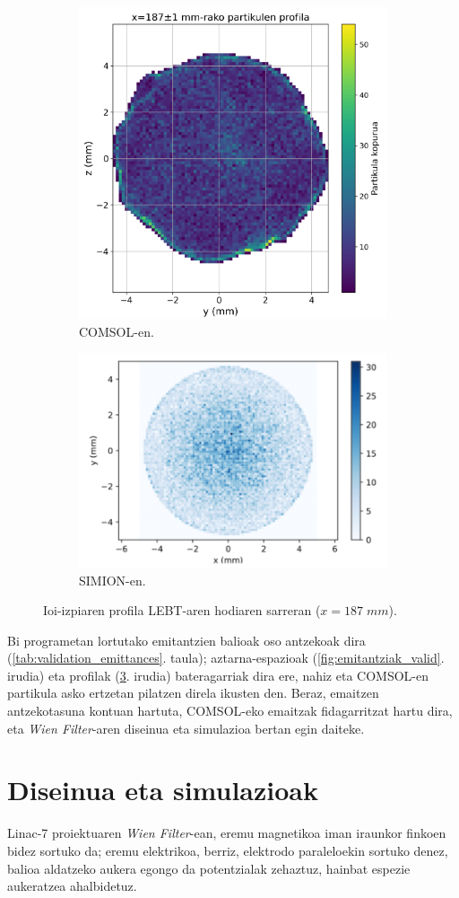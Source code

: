 \documentclass[12pt]{article}
\numberwithin{figure}{section}
\numberwithin{equation}{section}
\begin{document}
\begin{figure}[h]
    \centering
    \begin{subfigure}[b]{\textwidth}
        \centering
        \includegraphics[width=0.45\linewidth]{3 - COMSOL/exit_profile.png}
        \caption{COMSOL-en.}
        \label{fig:comsol_profile_valid}
    \end{subfigure}
    \begin{subfigure}[b]{\textwidth}
        \centering
        \includegraphics[width=0.45\linewidth]{3 - COMSOL/simion_profile.png}
        \caption{SIMION-en.}
        \label{fig:simion_profile}
    \end{subfigure}
    \caption{Ioi-izpiaren profila LEBT-aren hodiaren sarreran ($x=187\;mm$).}
    \label{fig:partikula_profilak_valid}
\end{figure}

Bi programetan lortutako emitantzien balioak oso antzekoak dira (\ref{tab:validation_emittances}. taula); aztarna-espazioak (\ref{fig:emitantziak_valid}. irudia) eta profilak (\ref{fig:partikula_profilak_valid}. irudia) bateragarriak dira ere, nahiz eta COMSOL-en partikula asko ertzetan pilatzen direla ikusten den. Beraz, emaitzen antzekotasuna kontuan hartuta, COMSOL-eko emaitzak fidagarritzat hartu dira, eta \textit{Wien Filter}-aren diseinua eta simulazioa bertan egin daiteke.

\newpage
\section{Diseinua eta simulazioak}
\label{sec:diseinusimulazio}
Linac-7 proiektuaren \textit{Wien Filter}-ean, eremu magnetikoa iman iraunkor finkoen bidez sortuko da; eremu elektrikoa, berriz, elektrodo paraleloekin sortuko denez, balioa aldatzeko aukera egongo da potentzialak zehaztuz, hainbat espezie aukeratzea ahalbidetuz.\\
\end{document}
